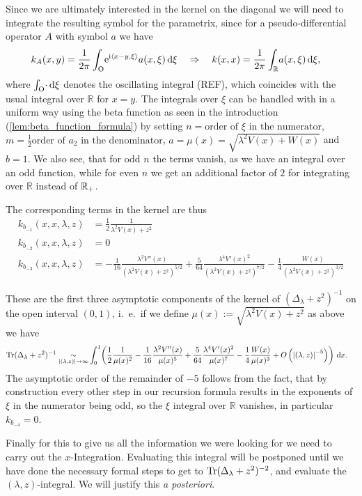 Since we are ultimately interested in the kernel on the diagonal we will need to
integrate the resulting symbol for the parametrix, since for a
pseudo-differential operator $A$ with symbol $a$ we have
\begin{align*}
  k_A(x,y) &= \frac{1}{2\pi}\Oscint{\xi}{
    \Eto{\mathrm i\left\langle x-y, \xi\right\rangle} a(x,\xi)
  }
  \quad
  \Rightarrow
  \quad
  k(x,x) = \frac{1}{2\pi}\Integ{\mathbb{R}}{\xi}{a(x,\xi)},
\end{align*}
where $\Oscint{\xi}\cdot$ denotes the oscillating integral (REF), which
coincides with the usual integral over $\mathbb{R}$ for $x = y$. The integrals
over $\xi$ can be handled with in a uniform way using the beta function as seen
in the introduction (\ref{lem:beta_function_formula}) by setting $n =
\text{order of $\xi$ in the numerator}$, $m = \tfrac12\text{order of $a_2$ in
the denominator}$, $a=\mu(x)=\sqrt{\lambda^2 V(x) + W(x)}$ and $b = 1$. We also
see, that for odd $n$ the terms vanish, as we have an integral over an odd
function, while for even $n$ we get an additional factor of $2$ for integrating
over $\mathbb{R}$ instead of $\Rplus$.

The corresponding terms in the kernel are thus
\begin{align}
  k_{b_{-1}}(x,x,\lambda,z) &= \frac{1}{2} \frac{1}{\lambda^2 V(x) + z^2} \\
  k_{b_{-2}}(x,x,\lambda,z) &= 0 \\
  k_{b_{-3}}(x,x,\lambda,z) &= - \frac{1}{16} \frac{\lambda^2 V''(x)}{(\lambda^2
    V(x) + z^2)^{5/2}} + \frac{5}{64} \frac{\lambda^4 V'(x)^2}{(\lambda^2V(x)
    + z^2)^{7/2}} -\frac{1}{4}\frac{W(x)}{(\lambda^2 V(x) + z^2)^{3/2}}
  \label{eqn:coeff-kernel}
\end{align}

These are the first three asymptotic components of the kernel of
$(\Delta_\lambda + z^2)^{-1}$ on the open interval $(0,1)$, i.~e.\ if we define
$\mu(x) := \sqrt{\lambda^2 V(x) + z^2}$ as above we have
\begin{align*}
  \Tr(\Delta_\lambda + z^2)^{-1} \SimAs{\Abs{(\lambda, z)}\to\infty}&
   \Int{x}{\left(
      \frac12\frac1{\mu(x)^{2}}
     -\frac1{16}\frac{\lambda^2 V''(x)}{\mu(x)^5}
     +\frac{5}{64}\frac{\lambda^4V'(x)^2}{\mu(x)^7}
     -\frac14\frac{W(x)}{\mu(x)^3}
     +O\left(\Abs{(\lambda, z)}^{-5}\right)
   \right)}.
\end{align*}
The asymptotic order of the remainder of $-5$ follows from the fact, that by
construction every other step in our recursion formula results in the exponents
of $\xi$ in the numerator being odd, so the $\xi$ integral over $\mathbb{R}$
vanishes, in particular $k_{b_{-4}} = 0$.

Finally for this to give us all the information we were looking for we need to
carry out the $x$-Integration. Evaluating this integral will be postponed until
we have done the necessary formal steps to get to $\Tr(\Delta_\lambda +
z^2)^{-2}$, and evaluate the $(\lambda,z)$-integral. We will justify this
\textit{a posteriori}.
